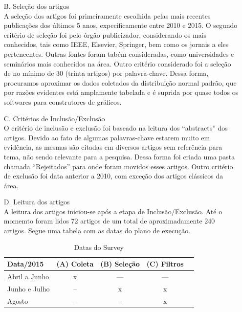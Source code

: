 \begin{enumerate}
 \item[B.] Seleção dos artigos\\
    A seleção dos artigos foi primeiramente escolhida pelas mais recentes publicações dos últimos 5 anos, expecificamente entre 2010 e 2015. 
    O segundo critério de seleção foi pelo órgão publicizador, considerando os mais conhecidos, tais como IEEE, Elsevier, Springer, bem como os jornais a eles pertencentes. 
    Outras fontes foram tabém consideradas, como universidades e seminários mais conhecidos na área.
    Outro critério considerado foi a seleção de no mínimo de 30 (trinta artigos) por palavra-chave.
    Dessa forma, procuramos aproximar os dados coletados da distribuição normal padrão, que por razões evidentes está amplamente
    tabelada e é suprida por quase todos os softwares para construtores de gráficos.\\

\pagebreak
    
 \item[C.] Critérios de Inclusão/Exclusão \\
    O critério de inclusão e exclusão foi baseado na leitura dos ``abstracts'' dos artigos. 
    Devido ao fato de algumas palavras-chave estarem muito em evidência, as mesmas são citadas em diversos artigos sem referência para tema,
    não sendo relevante para a pesquisa. Dessa forma foi criada uma pasta chamada ``Rejeitados'' para onde foram movidos esses artigos.
    Outro critério de exclusão foi data anterior a 2010, com exceção dos artigos clássicos da área.\\

 \item[D.] Leitura dos artigos \\
    A leitura dos artigos iniciou-se após a etapa de Inclusão/Exclusão.
    Até o momemto foram lidos 72 artigos de um total de aproximadamente 240 artigos.
    Segue uma tabela com as datas do plano de execução.
  
    \begin{table}[htbp]
      \scriptsize
      \centering
      \caption{Datas do Survey}
	\begin{tabular}{l|c|c|c|c}
	\hline
	\textbf{Data/2015} & \textbf{(A) Coleta} & (B) \textbf{Seleção} & \textbf{(C) Filtros} \\
	\hline
	Abril a Junho & x & --- & --- \\ \hline
	Junho e Julho & -- & x & x \\ \hline
	Agosto & -- & -- & x \\ \hline
	\end{tabular}
    \end{table}
 \end{enumerate}



